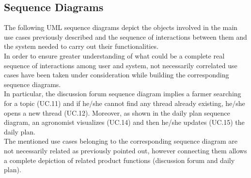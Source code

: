 \subsection{Sequence Diagrams}

The following UML sequence diagrams depict the objects involved in the main use cases previously described and the sequence of interactions between them and the system needed to carry out their functionalities.\\

In order to ensure greater understanding of what could be a complete real sequence of interactions among user and system, not necessarily correlated use cases have been taken under consideration while building the corresponding sequence diagrams.\\
In particular, the discussion forum sequence diagram implies a farmer searching for a topic (UC.11) and if he/she cannot find any thread already existing, he/she opens a new thread (UC.12). Moreover, as shown in the daily plan sequence diagram, an agronomist visualizes (UC.14) and then he/she updates (UC.15) the daily plan.\\
The mentioned use cases belonging to the corresponding sequence diagram are not necessarily related as previously pointed out, however connecting them allows a complete depiction of related product functions (discussion forum and daily plan).

